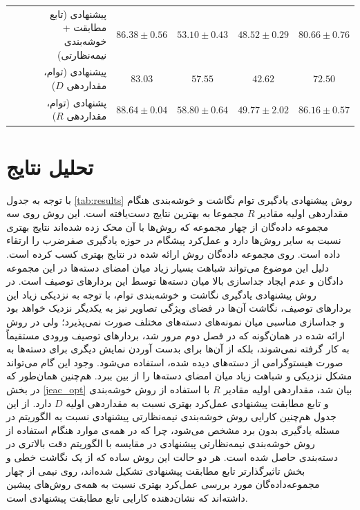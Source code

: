 \begin{table}[ht]
{\begin{tabular}{|r|r|c|c|c|c|}
& پیشنهادی (تابع مطابقت + خوشه‌بندی نیمه‌نظارتی)
                        & $86.38 \pm 0.56$              & $ 53.10\pm 0.43 $             & $48.52 \pm 0.29$              &$ 80.66 \pm 0.76$ \\
& پیشنهادی (توام، مقداردهی $D$)
                     & $83.03$                        & $57.55$                       & $42.62$          & $72.50$\\
& پشنهادی (توام، مقداردهی $R$)
                     & \textbf{\em $88.64 \pm 0.04$}  & \textbf{\em $58.80 \pm 0.64$} & $49.77 \pm 2.02$ & \textbf{\em $86.16 \pm 0.57$} \\
\hline
\end{tabular}
}
\end{table}

\section{تحلیل نتایج}\label{exp:discussion}
با توجه به جدول \ref{tab:results} روش پیشنهادی یادگیری توام نگاشت و خوشه‌بندی هنگام مقداردهی اولیه مقادیر $R$ مجموعا به بهترین نتایج دست‌یافته است. این روش روی سه مجموعه داد‌ه‌گان از چهار مجموعه که روش‌ها با آن محک زده شده‌اند نتایج بهتری نسبت به سایر روش‌ها دارد و عمل‌کرد پیشگام در حوزه یادگیری صفرضرب را ارتقاء داده است. روی مجموعه داده‌گان  روش ارائه شده در 
\cite{agnostic}
نتایج بهتری کسب کرده است. دلیل این موضوع می‌تواند شباهت بسیار زیاد میان امضای دسته‌ها در این مجموعه دادگان و عدم ایجاد جداسازی بالا میان دسته‌ها توسط این بردارهای توصیف است. در روش پیشنهادی یادگیری نگاشت و خوشه‌بندی توام، با توجه به نزدیکی زیاد این بردارهای توصیف، نگاشت آن‌ها در فضای ویژگی تصاویر نیز به یکدیگر نزدیک خواهد بود و جداسازی مناسبی میان نمونه‌های دسته‌های مختلف صورت 
نمی‌پذیرد؛ ولی در روش ارائه شده در \cite{agnostic} همان‌گونه که در فصل دوم مرور شد، بردارهای توصیف ورودی 
مستقیماً به کار گرفته نمی‌شوند، بلکه از آن‌ها برای بدست آوردن نمایش دیگری برای دسته‌ها  به صورت هیستوگرامی از دسته‌های دیده شده، استفاده می‌شود. وجود این گام می‌تواند مشکل نزدیکی و شباهت زیاد میان امضای دسته‌ها را از بین ببرد. هم‌چنین همان‌طور که در بخش \ref{jeac_opt} بیان شد، مقداردهی اولیه مقادیر $R$ با استفاده از روش خوشه‌بندی و تابع مطابقت پیشنهادی عمل‌کرد بهتری نسبت به مقداردهی اولیه $D$ دارد. از این جدول هم‌چنین کارایی روش خوشه‌بندی نیمه‌نظارتی پیشنهادی نسبت به الگوریتم  در مسئله یادگیری بدون برد مشخص می‌شود، چرا که در همه‌ی موارد هنگام استفاده از روش خوشه‌بندی نیمه‌نظارتی پیشنهادی در مقایسه با  الگوریتم  دقت بالاتری در دسته‌بندی حاصل شده است. هر دو حالت این روش ساده که از یک نگاشت خطی و بخش تاثیرگذارتر تابع مطابقت پیشنهادی تشکیل شده‌اند، روی نیمی از چهار مجموعه‌داده‌گان مورد بررسی عمل‌کرد بهتری نسبت به همه‌ی روش‌های پیشین داشته‌اند که نشان‌دهنده کارایی تابع مطابقت پیشنهادی است.

